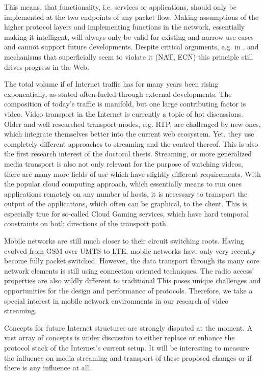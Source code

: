 This means, that functionality, i.e. services or applications, should only be implemented at the two endpoints of any packet flow. Making assumptions of the higher protocol layers and implementing functions in the network, essentially making it intelligent, will always only be valid for existing and narrow use cases and cannot support future developments. Despite critical arguments, e.g. in \cite{reed2000endofe2e, moors2002critical}, and mechanisms that superficially seem to violate it (NAT, ECN) this principle still drives progress in the Web.

The total volume if of Internet traffic has for many years been rising exponentially, as stated often fueled through external developments. The composition of today's traffic is manifold, but one large contributing factor is video. 
Video transport in the Internet is currently a topic of hot discussions. Older and well researched transport modes, e.g. RTP, are challenged by new ones, which integrate themselves better into the current web ecosystem. Yet, they use completely different approaches to streaming and the control thereof. This is also the first research interest of the doctoral thesis.
Streaming, or more generalized media transport is also not only relevant for the purpose of watching videos, there are many more fields of use which have slightly different requirements. With the popular cloud computing approach, which essentially means to run ones applications remotely on any number of hosts, it is necessary to transport the output of the applications, which often can be graphical, to the client. This is especially true for so-called Cloud Gaming services, which have hard temporal constraints on both directions of the transport path.

Mobile networks are still much closer to their circuit switching roots. Having evolved from GSM over UMTS to LTE, mobile networks have only very recently become fully packet switched. However, the data transport through its many core network elements is still using connection oriented techniques. The radio access' properties are also wildly different to traditional This poses unique challenges and opportunities for the design and performance of protocols. Therefore, we take a special interest in mobile network environments in our research of video streaming.

Concepts for future Internet structures are strongly disputed at the moment. A vast array of concepts is under discussion to either replace or enhance the protocol stack of the Internet's current setup. It will be interesting to measure the influence on media streaming and transport of these proposed changes or if there is any influence at all.

